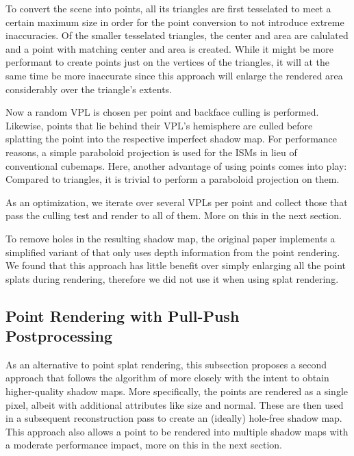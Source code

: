 To convert the scene into points, all its triangles are first tesselated to meet a certain maximum size in order for the point conversion to not introduce extreme inaccuracies. Of the smaller tesselated triangles, the center and area are calulated and a point with matching center and area is created. While it might be more performant to create points just on the vertices of the triangles, it will at the same time be more inaccurate since this approach will enlarge the rendered area considerably over the triangle's extents.

Now a random VPL is chosen per point and backface culling is performed. Likewise, points that lie behind their VPL's hemisphere are culled before splatting the point into the respective imperfect shadow map. For performance reasons, a simple paraboloid projection is used for the ISMs in lieu of conventional cubemaps. Here, another advantage of using points comes into play: Compared to triangles, it is trivial to perform a paraboloid projection on them.

As an optimization, we iterate over several VPLs per point and collect those that pass the culling test and render to all of them. More on this in the next section.

To remove holes in the resulting shadow map, the original paper implements a simplified variant of \cite{Marroquim:2007:reconstruction} that only uses depth information from the point rendering. We found that this approach has little benefit over simply enlarging all the point splats during rendering, therefore we did not use it when using splat rendering.



\subsection{Point Rendering with Pull-Push Postprocessing}

As an alternative to point splat rendering, this subsection proposes a second approach that follows the algorithm of \cite{Marroquim:2007:reconstruction} more closely with the intent to obtain higher-quality shadow maps. More specifically, the points are rendered as a single pixel, albeit with additional attributes like size and normal. These are then used in a subsequent reconstruction pass to create an (ideally) hole-free shadow map. This approach also allows a point to be rendered into multiple shadow maps with a moderate performance impact, more on this in the next section.

